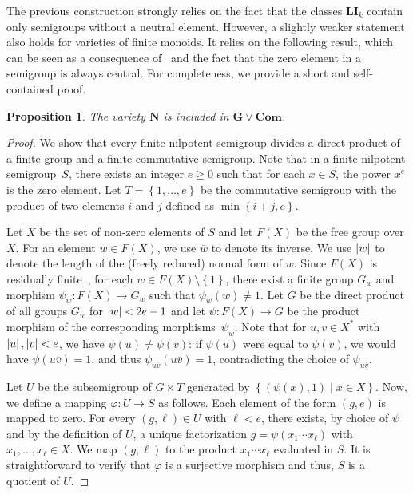 \documentclass[11pt]{article}
\numberwithin{equation}{section}
\newtheorem{proposition}[theorem]{Proposition}
\theoremstyle{definition}
\theoremstyle{plain}
\renewcommand{\geq}{\geqslant}
\renewcommand{\ge}{\geq}
\newcommand{\abs}[1]{\ensuremath\left|#1\right|}
\newcommand{\set}[2]{\ensuremath{\left\{#1 \mid #2\right\}}}
\newcommand{\os}[1]{\ensuremath{\left\{#1\right\}}}
\newcommand{\vNil}{\mathbf{N}}
\newcommand{\vLI}{\mathbf{LI}}
\newcommand{\vCom}{\mathbf{Com}}
\newcommand{\vG}{\mathbf{G}}
\begin{document}
The previous construction strongly relies on the fact that the classes $\vLI_k$
contain only semigroups without a neutral element.
%
However, a slightly weaker statement also holds for varieties of finite
monoids.
%
It relies on the following result, which can be seen as a consequence
of~\cite{Almeida88} and the fact that the zero element in a semigroup is always
central.
%
For completeness, we provide a short and self-contained proof.

\begin{proposition}
  The variety $\vNil$ is included in $\vG \lor \vCom$.
\end{proposition}

\begin{proof}
  We show that every finite nilpotent semigroup divides a direct product of a
  finite group and a finite commutative semigroup.
  Note that in a finite nilpotent semigroup~$S$, there exists an integer $e \ge
  0$ such that for each $x \in S$, the power $x^e$ is the zero element.
  Let $T = \os{1, \dots, e}$ be the commutative semigroup with the product of
  two elements $i$ and $j$ defined as $\min\os{i+j,e}$.

  Let $X$ be the set of non-zero elements of $S$ and let $F(X)$ be the free
  group over $X$. For an element $w \in F(X)$, we use $\overline w$ to denote
  its inverse. We use $\abs{w}$ to denote the length of the (freely reduced)
  normal form of $w$.
  Since $F(X)$ is residually finite~\cite{Levi33,LS01}, for each $w \in F(X)
  \setminus \os{1}$, there exist a finite group $G_w$ and morphism $\psi_w
  \colon F(X) \to G_w$ such that $\psi_w(w) \ne 1$.
  Let $G$ be the direct product of all groups $G_w$ for
  $\abs{w} < 2e-1$ and let $\psi \colon F(X) \to G$ be the product morphism
  of the corresponding morphisms~$\psi_w$. Note that for $u, v \in X^*$ with
  $\abs{u}, \abs{v} < e$, we have $\psi(u) \ne \psi(v)$: if $\psi(u)$ were
  equal to $\psi(v)$, we would have $\psi(u \overline v) = 1$, and thus
  $\psi_{u \overline v}(u \overline v) = 1$, contradicting the choice of
  $\psi_{u \overline v}$.

  Let $U$ be the subsemigroup of $G \times T$ generated by $\set{(\psi(x),
  1)}{x \in X}$.
  Now, we define a mapping $\varphi \colon U \to S$ as follows.
  Each element of the form $(g, e)$ is mapped to zero.
  For every $(g, \ell) \in U$ with $\ell < e$, there exists, by choice of
  $\psi$ and by the definition of $U$, a unique factorization $g = \psi(x_1
  \cdots x_\ell)$ with $x_1, \dots, x_\ell \in X$.  We map $(g, \ell)$ to the
  product $x_1 \cdots x_\ell$ evaluated in $S$.
  It is straightforward to verify that $\varphi$ is a surjective morphism and
  thus, $S$ is a quotient of $U$.
\end{proof}
\end{document}

